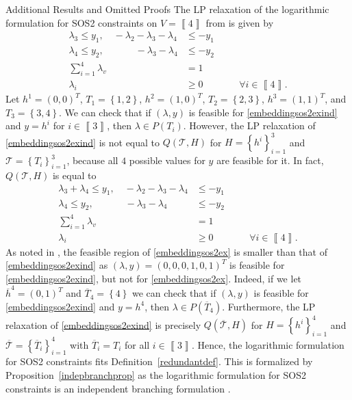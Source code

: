 \documentclass[mnsc]{informs3}
\newcommand{\set}[1]{\left\{#1\right\}}                     %
\newcommand{\bra}[1]{\left(#1\right)}
\newcommand{\sidx}[1]{\left\llbracket     #1 \right\rrbracket}
\begin{document}
\begin{APPENDIX}{Additional Results and Omitted Proofs}
The LP relaxation of the logarithmic formulation for SOS2 constraints on $V=\sidx{4}$ from \cite{Modeling-Disjunctive-Constraints-FULL} is given by 
 \begin{subequations}\label{embeddingsos2exind}
\begin{alignat}{3}
 \lambda_3 \leq  y_1,\quad
 -\lambda_2 -\lambda_3-\lambda_4& \leq  -y_1 &\quad&\\
  \lambda_4 \leq  y_2, \quad\quad\quad\;
  -\lambda_3-\lambda_4& \leq  -y_2 &\quad&\\
\sum\nolimits_{i=1}^{4} \lambda_v &=1\\
\lambda_i&\geq 0 &\quad& \forall i \in \sidx{4}.
\end{alignat}
\end{subequations}
Let ${h}^1=(0,0)^T$, $T_1=\set{1,2}$,  ${h}^2=(1,0)^T$, ${T}_2=\set{2,3}$, ${h}^3=(1,1)^T$, and ${T}_3=\set{3,4}$. We can check that if $\bra{\lambda,y}$ is feasible for \eqref{embeddingsos2exind} and $y=h^i$ for $i\in\sidx{3}$, then $\lambda\in P\bra{T_i}$. However, the LP relaxation of \eqref{embeddingsos2exind} is not equal to $Q\bra{{\mathcal{T}},H}$ for $H=\set{h^i}_{i=1}^{3}$ and $\mathcal{T}=\set{T_i}_{i=1}^3$, because all $4$ possible values for $y$ are feasible for it. In fact, $Q\bra{\mathcal{T},H}$ is equal to 
 \begin{subequations}\label{embeddingsos2ex}
\begin{alignat}{3}
 \lambda_3+\lambda_4 \leq  y_1, \quad
 -\lambda_2 -\lambda_3-\lambda_4& \leq  -y_1 &\quad&\\
  \lambda_4 \leq  y_2,\quad\quad\quad\;
  -\lambda_3-\lambda_4 &\leq  -y_2 &\quad&\\
\sum\nolimits_{i=1}^{4} \lambda_v &=1\\
\lambda_i&\geq 0 &\quad& \forall i \in \sidx{4}.
\end{alignat}
\end{subequations}
As noted in \cite{MuldoonPhd}, the feasible region of \eqref{embeddingsos2ex} is smaller than that of \eqref{embeddingsos2exind} as  $\bra{\lambda,y}=\bra{0,0,0,1,0,1}^T$ is feasible for  \eqref{embeddingsos2exind}, but not for \eqref{embeddingsos2ex}. Indeed, if we let   $\overline{h}^4=(0,1)^T$ and $\overline{T}_4=\set{4}$ we can check that if $\bra{\lambda,y}$ is feasible for \eqref{embeddingsos2exind} and $y=h^4$, then $\lambda\in P\bra{\overline{T}_4}$. Furthermore,  the LP relaxation of \eqref{embeddingsos2exind} is precisely 
 $Q\bra{\overline{\mathcal{T}},H}$ for $H=\set{h^i}_{i=1}^{4}$ and  $\overline{\mathcal{T}}=\set{\overline{T}_i}_{i=1}^{4}$ with $\overline{T}_i=T_i$ for all $i\in\sidx{3}$. Hence, the logarithmic formulation for SOS2 constraints \cite{Modeling-Disjunctive-Constraints-FULL}  fits Definition~\ref{redundantdef}. This is formalized by Proposition~\ref{indepbranchprop} as the logarithmic formulation for SOS2 constraints is an independent branching formulation \citep{Modeling-Disjunctive-Constraints-FULL}.



\end{APPENDIX}
\end{document}

